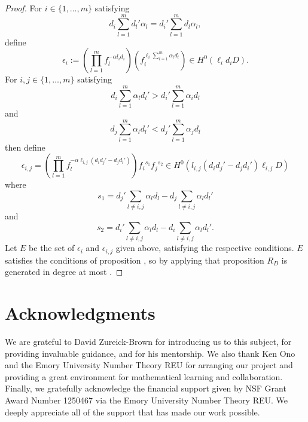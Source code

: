 \documentclass{amsart}
\theoremstyle{plain}
\theoremstyle{definition}
\theoremstyle{remark}
\numberwithin{equation}{section}
\begin{document}
\begin{proof}
For $i \in \{1, \ldots, m\}$ satisfying 
\begin{equation}\label{eqn:condition-for-e_i}
	d_i \sum_{l=1}^m d_l' \alpha_l = d_i' \sum_{l=1}^m d_l \alpha_l,
\end{equation}
define
\[
	\epsilon_i := (\prod_{l=1}^m f_l^{-\alpha l_i d_i}) (f_i^{\ell_i \sum_{l=1}^m \alpha_l d_l}) \in H^0(\ell_i d_i D).
\]
For $i, j \in \{1, \ldots, m\}$ satisfying
\begin{equation}\label{eqn:condition-e_i,j-i}
	d_i \sum_{l=1}^m \alpha_l d_l' > d_i' \sum_{l=1}^m \alpha_i d_l
\end{equation}
and
\begin{equation}\label{eqn:condition-e_i,j-j}
	d_j \sum_{l=1}^m \alpha_l d_l' < d_j' \sum_{l=1}^m \alpha_j d_l
\end{equation}
then define
\[
	\epsilon_{i, j} = (\prod_{l=1}^m f_l^{-\alpha \ell_{i,j} (d_i d_j' - d_j d_i')}) {f_i}^{s_1} {f_j}^{s_2} \in H^0(l_{i,j}(d_i d_j' - d_j d_i')\ell_{i,j}D)
\]
where
\[
	s_1 = d_j' \sum_{l \ne i,j} \alpha_l d_l - d_j \sum_{l\ne i, j} \alpha_l d_l'
\]
and
\[
	s_2 = d_i' \sum_{l \ne i,j} \alpha_l d_l - d_i \sum_{l\ne i, j} \alpha_l d_l'.
\]
Let $E$ be the set of $\epsilon_i$ and $\epsilon_{i,j}$ given above, satisfying the respective conditions.
$E$ satisfies the conditions of proposition , so by applying that proposition $R_D$ is generated in degree at most .
\end{proof}



\section{Acknowledgments}

We are grateful to David Zureick-Brown for introducing us to this
subject, for providing invaluable guidance,
and for his mentorship. We also thank Ken Ono and the
Emory University Number Theory REU for arranging our project and
providing a great environment for mathematical learning and
collaboration.
Finally, we gratefully acknowledge the financial support given by
NSF Grant Award Number 1250467 via the Emory University Number
Theory REU. We deeply appreciate all of the support that has made
our work possible.


\nocite{*}
{}

\end{document}
